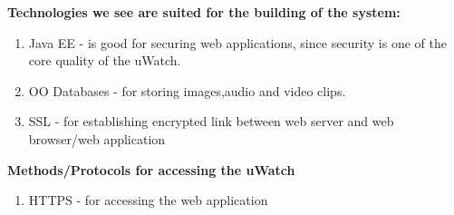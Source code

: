 \textbf{Technologies we see are suited for the building of the system: }
\begin{enumerate}
    \item Java EE - is good for securing web applications, since security is one of the core quality of the uWatch.
    
	\item OO Databases - for storing images,audio and video clips.
	\item SSL - for establishing encrypted link between web server and web browser/web application 
\end{enumerate}

\textbf{Methods/Protocols for accessing the uWatch}
\begin{enumerate}
    \item HTTPS - for accessing the web application 
\end{enumerate}
